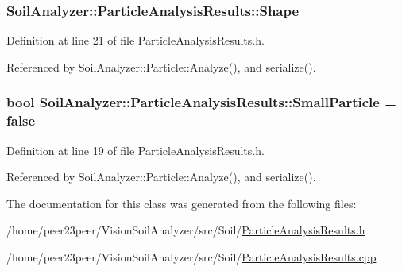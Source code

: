 \subsubsection[{Shape}]{ Soil\+Analyzer\+::\+Particle\+Analysis\+Results\+::\+Shape}\label{class_soil_analyzer_1_1_particle_analysis_results_a75230aa0675b2df489c08bcfffb43b97}


Definition at line 21 of file Particle\+Analysis\+Results.\+h.



Referenced by Soil\+Analyzer\+::\+Particle\+::\+Analyze(), and serialize().

\hypertarget{class_soil_analyzer_1_1_particle_analysis_results_a8aaa7f053d68bce6f1ad2b7bcd30cd95}{}
\subsubsection[{Small\+Particle}]{\setlength{\rightskip}{0pt plus 5cm}bool Soil\+Analyzer\+::\+Particle\+Analysis\+Results\+::\+Small\+Particle = false}\label{class_soil_analyzer_1_1_particle_analysis_results_a8aaa7f053d68bce6f1ad2b7bcd30cd95}


Definition at line 19 of file Particle\+Analysis\+Results.\+h.



Referenced by Soil\+Analyzer\+::\+Particle\+::\+Analyze(), and serialize().



The documentation for this class was generated from the following files\+:\begin{DoxyCompactItemize}
\item 
/home/peer23peer/\+Vision\+Soil\+Analyzer/src/\+Soil/\hyperlink{_particle_analysis_results_8h}{Particle\+Analysis\+Results.\+h}\item 
/home/peer23peer/\+Vision\+Soil\+Analyzer/src/\+Soil/\hyperlink{_particle_analysis_results_8cpp}{Particle\+Analysis\+Results.\+cpp}\end{DoxyCompactItemize}
